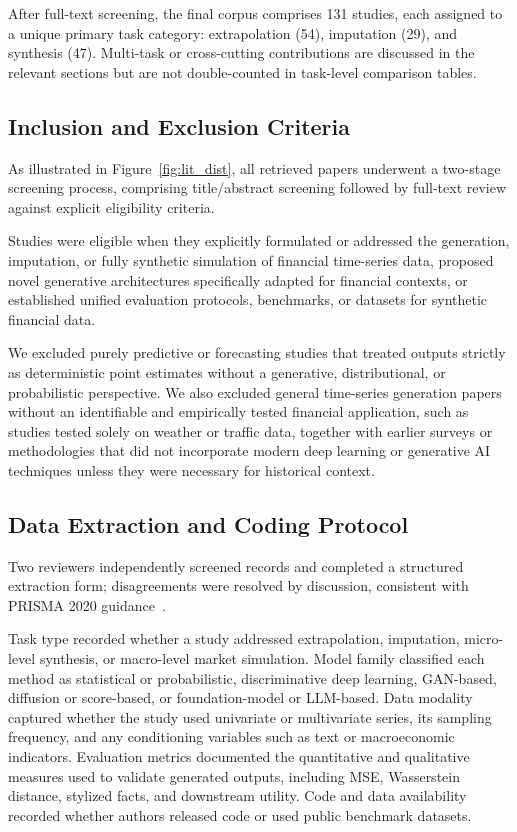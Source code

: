 After full-text screening, the final corpus comprises 131 studies, each assigned to a unique primary task category: extrapolation (54), imputation (29), and synthesis (47). Multi-task or cross-cutting contributions are discussed in the relevant sections but are not double-counted in task-level comparison tables.

\subsection{Inclusion and Exclusion Criteria}
As illustrated in Figure~\ref{fig:lit_dist}, all retrieved papers underwent a two-stage screening process, comprising title/abstract screening followed by full-text review against explicit eligibility criteria.

Studies were eligible when they explicitly formulated or addressed the generation, imputation, or fully synthetic simulation of financial time-series data, proposed novel generative architectures specifically adapted for financial contexts, or established unified evaluation protocols, benchmarks, or datasets for synthetic financial data.

We excluded purely predictive or forecasting studies that treated outputs strictly as deterministic point estimates without a generative, distributional, or probabilistic perspective. We also excluded general time-series generation papers without an identifiable and empirically tested financial application, such as studies tested solely on weather or traffic data, together with earlier surveys or methodologies that did not incorporate modern deep learning or generative AI techniques unless they were necessary for historical context.

\subsection{Data Extraction and Coding Protocol}
Two reviewers independently screened records and completed a structured extraction form; disagreements were resolved by discussion, consistent with PRISMA 2020 guidance~\citep{page2021prisma}.

Task type recorded whether a study addressed extrapolation, imputation, micro-level synthesis, or macro-level market simulation. Model family classified each method as statistical or probabilistic, discriminative deep learning, GAN-based, diffusion or score-based, or foundation-model or LLM-based. Data modality captured whether the study used univariate or multivariate series, its sampling frequency, and any conditioning variables such as text or macroeconomic indicators. Evaluation metrics documented the quantitative and qualitative measures used to validate generated outputs, including MSE, Wasserstein distance, stylized facts, and downstream utility. Code and data availability recorded whether authors released code or used public benchmark datasets.

